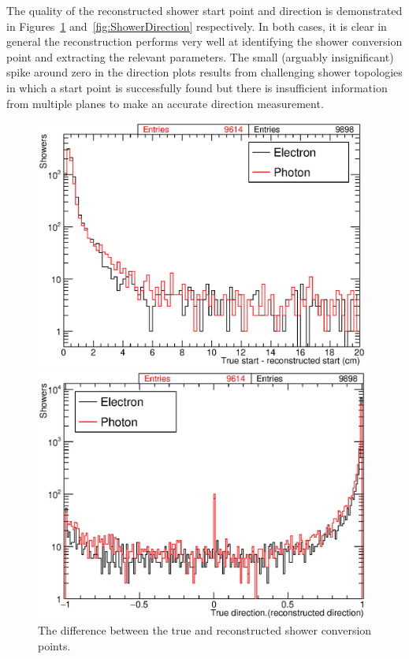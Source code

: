 The quality of the reconstructed shower start point and direction is demonstrated in Figures~\ref{fig:ShowerStart} and~\ref{fig:ShowerDirection} respectively.  In both cases, it is clear in general the reconstruction performs very well at identifying the shower conversion point and extracting the relevant parameters.  The small (arguably insignificant) spike around zero in the direction plots results from challenging shower topologies in which a start point is successfully found but there is insufficient information from multiple planes to make an accurate direction measurement.

\begin{figure}
  \begin{minipage}[t]{0.48\linewidth}
    \centering
    \includegraphics[width=0.98\textwidth]{ShowerStart.eps}
    \caption[The difference between the true and reconstructed shower conversion points.]{The difference between the true and reconstructed shower conversion points.}
    \label{fig:ShowerStart}
  \end{minipage}
  \hfill
  \begin{minipage}[t]{0.48\linewidth}
    \centering
    \includegraphics[width=0.98\textwidth]{ShowerDirection.eps}

\end{minipage}
\end{figure}
